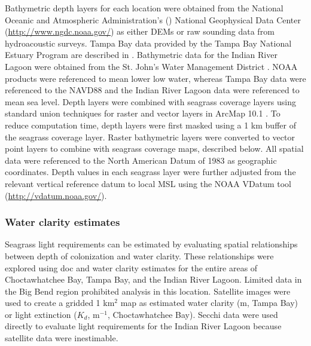\documentclass[letterpaper,12pt,oneside]{article}\usepackage[]{graphicx}\usepackage[]{color}
\begin{document}
Bathymetric depth layers for each location were obtained from the National Oceanic and Atmospheric Administration's () National Geophysical Data Center (\url{http://www.ngdc.noaa.gov/}) as either \acp{DEM} or raw sounding data from hydroacoustic surveys.  Tampa Bay data provided by the Tampa Bay National Estuary Program are described in \citet{Tyler07}. Bathymetric data for the Indian River Lagoon were obtained from the St. John's Water Management District \citep{CPE97}.  \ac{NOAA} products were referenced to mean lower low water, whereas Tampa Bay data were referenced to the \ac{NAVD88} and the Indian River Lagoon data were referenced to mean sea level.  Depth layers were combined with seagrass coverage layers using standard union techniques for raster and vector layers in ArcMap 10.1 \citep{ESRI12}.  To reduce computation time, depth layers were first masked using a 1 km buffer of the seagrass coverage layer.  Raster bathymetric layers were converted to vector point layers to combine with seagrass coverage maps, described below.  All spatial data were referenced to the North American Datum of 1983 as geographic coordinates.  Depth values in each seagrass layer were further adjusted from the relevant vertical reference datum to local \ac{MSL} using the \ac{NOAA} VDatum tool (\url{http://vdatum.noaa.gov/}).

\subsubsection{Water clarity estimates}

Seagrass light requirements can be estimated by evaluating spatial relationships between depth of colonization and water clarity.  These relationships were explored using \ac{doc} and water clarity estimates for the entire areas of Choctawhatchee Bay, Tampa Bay, and the Indian River Lagoon. Limited data in the Big Bend region prohibited analysis in this location.  Satellite images were used to create a gridded 1 km$^2$ map as estimated water clarity (m, Tampa Bay) or light extinction ($K_d$, m$^{-1}$, Choctawhatchee Bay).  Secchi data were used directly to evaluate light requirements for the Indian River Lagoon because satellite data were inestimable.
\end{document}
